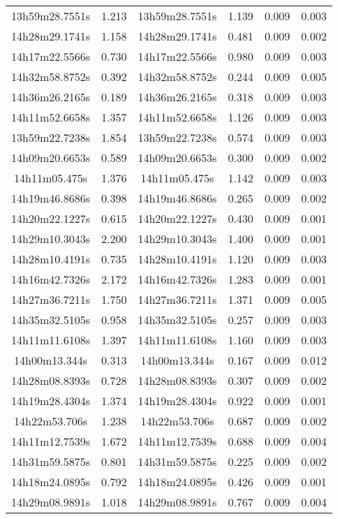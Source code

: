 \begin{table}
\begin{tabular}{cccccc}
13h59m28.7551s & 1.213 & 13h59m28.7551s & 1.139 & 0.009 & 0.003 \\
14h28m29.1741s & 1.158 & 14h28m29.1741s & 0.481 & 0.009 & 0.002 \\
14h17m22.5566s & 0.730 & 14h17m22.5566s & 0.980 & 0.009 & 0.003 \\
14h32m58.8752s & 0.392 & 14h32m58.8752s & 0.244 & 0.009 & 0.005 \\
14h36m26.2165s & 0.189 & 14h36m26.2165s & 0.318 & 0.009 & 0.003 \\
14h11m52.6658s & 1.357 & 14h11m52.6658s & 1.126 & 0.009 & 0.003 \\
13h59m22.7238s & 1.854 & 13h59m22.7238s & 0.574 & 0.009 & 0.003 \\
14h09m20.6653s & 0.589 & 14h09m20.6653s & 0.300 & 0.009 & 0.002 \\
14h11m05.475s & 1.376 & 14h11m05.475s & 1.142 & 0.009 & 0.003 \\
14h19m46.8686s & 0.398 & 14h19m46.8686s & 0.265 & 0.009 & 0.002 \\
14h20m22.1227s & 0.615 & 14h20m22.1227s & 0.430 & 0.009 & 0.001 \\
14h29m10.3043s & 2.200 & 14h29m10.3043s & 1.400 & 0.009 & 0.001 \\
14h28m10.4191s & 0.735 & 14h28m10.4191s & 1.120 & 0.009 & 0.003 \\
14h16m42.7326s & 2.172 & 14h16m42.7326s & 1.283 & 0.009 & 0.001 \\
14h27m36.7211s & 1.750 & 14h27m36.7211s & 1.371 & 0.009 & 0.005 \\
14h35m32.5105s & 0.958 & 14h35m32.5105s & 0.257 & 0.009 & 0.003 \\
14h11m11.6108s & 1.397 & 14h11m11.6108s & 1.160 & 0.009 & 0.003 \\
14h00m13.344s & 0.313 & 14h00m13.344s & 0.167 & 0.009 & 0.012 \\
14h28m08.8393s & 0.728 & 14h28m08.8393s & 0.307 & 0.009 & 0.002 \\
14h19m28.4304s & 1.374 & 14h19m28.4304s & 0.922 & 0.009 & 0.001 \\
14h22m53.706s & 1.238 & 14h22m53.706s & 0.687 & 0.009 & 0.002 \\
14h11m12.7539s & 1.672 & 14h11m12.7539s & 0.688 & 0.009 & 0.004 \\
14h31m59.5875s & 0.801 & 14h31m59.5875s & 0.225 & 0.009 & 0.002 \\
14h18m24.0895s & 0.792 & 14h18m24.0895s & 0.426 & 0.009 & 0.001 \\
14h29m08.9891s & 1.018 & 14h29m08.9891s & 0.767 & 0.009 & 0.004 \\

\end{tabular}
\end{table}
